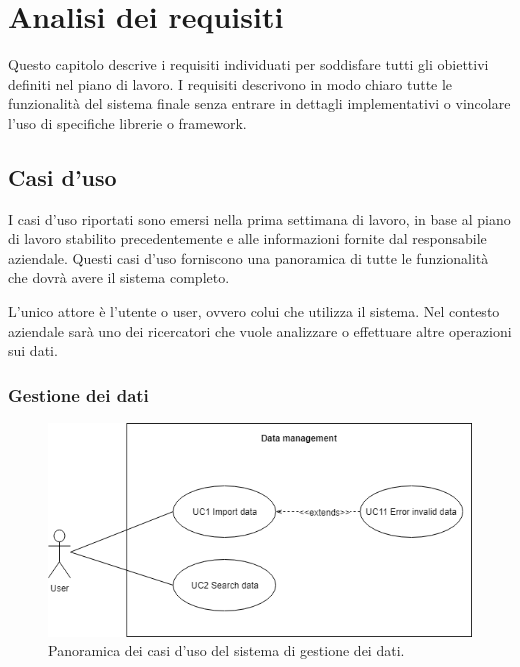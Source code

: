 \chapter{Analisi dei requisiti}

Questo capitolo descrive i requisiti individuati per soddisfare tutti gli obiettivi definiti nel piano di lavoro.
I requisiti descrivono in modo chiaro tutte le funzionalità del sistema finale senza entrare in dettagli implementativi o vincolare l'uso di specifiche librerie o framework.


\section{Casi d'uso}
I casi d'uso riportati sono emersi nella prima settimana di lavoro, in base al piano di lavoro stabilito precedentemente e alle informazioni fornite dal responsabile aziendale. 
Questi casi d'uso forniscono una panoramica di tutte le funzionalità che dovrà avere il sistema completo.

L'unico attore è l'utente o user, ovvero colui che utilizza il sistema. Nel contesto aziendale sarà uno dei ricercatori che vuole analizzare o effettuare altre operazioni sui dati.



\subsection{Gestione dei dati}

\begin{figure} [H]
	\includegraphics[width=\textwidth]{figures/UCDataManagement}
	\caption[Panoramica casi d'uso gestione dei dati]{
		Panoramica dei casi d'uso del sistema di gestione dei dati.
		\label{fig:UCDataManagement}}
\end{figure}

